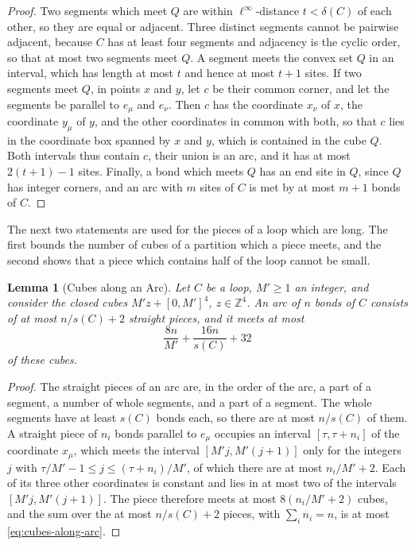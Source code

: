 \documentclass[11pt]{preprint}
\numberwithin{equation}{section}
\newtheorem{lemma}[theorem]{Lemma}
\theoremstyle{definition}
\theoremstyle{remark}
\theoremstyle{plain}
\begin{document}
\begin{proof}
Two segments which meet $Q$ are within $\ell^\infty$-distance $t < \delta(C)$ of each other, so they are equal or adjacent. Three distinct segments cannot be pairwise adjacent, because $C$ has at least four segments and adjacency is the cyclic order, so that at most two segments meet $Q$. A segment meets the convex set $Q$ in an interval, which has length at most $t$ and hence at most $t + 1$ sites. If two segments meet $Q$, in points $x$ and $y$, let $c$ be their common corner, and let the segments be parallel to $e_\mu$ and $e_\nu$. Then $c$ has the coordinate $x_\nu$ of $x$, the coordinate $y_\mu$ of $y$, and the other coordinates in common with both, so that $c$ lies in the coordinate box spanned by $x$ and $y$, which is contained in the cube $Q$. Both intervals thus contain $c$, their union is an arc, and it has at most $2(t + 1) - 1$ sites. Finally, a bond which meets $Q$ has an end site in $Q$, since $Q$ has integer corners, and an arc with $m$ sites of $C$ is met by at most $m + 1$ bonds of $C$.
\end{proof}

The next two statements are used for the pieces of a loop which are long. The first bounds the number of cubes of a partition which a piece meets, and the second shows that a piece which contains half of the loop cannot be small.

\begin{lemma}[Cubes along an Arc]\label{lem:cubes-along-arc}
Let $C$ be a loop, $M' \geq 1$ an integer, and consider the closed cubes $M'z + [0, M']^4$, $z \in \mathbb Z^4$. An arc of $n$ bonds of $C$ consists of at most $n/s(C) + 2$ straight pieces, and it meets at most
\begin{equation}\label{eq:cubes-along-arc}
    \frac{8n}{M'} + \frac{16n}{s(C)} + 32
\end{equation}
of these cubes.
\end{lemma}

\begin{proof}
The straight pieces of an arc are, in the order of the arc, a part of a segment, a number of whole segments, and a part of a segment. The whole segments have at least $s(C)$ bonds each, so there are at most $n/s(C)$ of them. A straight piece of $n_i$ bonds parallel to $e_\mu$ occupies an interval $[\tau, \tau + n_i]$ of the coordinate $x_\mu$, which meets the interval $[M'j, M'(j + 1)]$ only for the integers $j$ with $\tau/M' - 1 \leq j \leq (\tau + n_i)/M'$, of which there are at most $n_i/M' + 2$. Each of its three other coordinates is constant and lies in at most two of the intervals $[M'j, M'(j + 1)]$. The piece therefore meets at most $8(n_i/M' + 2)$ cubes, and the sum over the at most $n/s(C) + 2$ pieces, with $\sum_in_i = n$, is at most \eqref{eq:cubes-along-arc}.
\end{proof}
\end{document}
